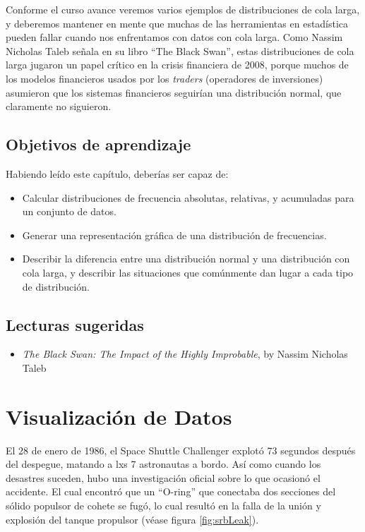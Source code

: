 \documentclass[
  12pt,
]{book}
\providecommand{\tightlist}{%
  \setlength{\itemsep}{0pt}\setlength{\parskip}{0pt}}
\begin{document}
Conforme el curso avance veremos varios ejemplos de distribuciones de cola larga, y deberemos mantener en mente que muchas de las herramientas en estadística pueden fallar cuando nos enfrentamos con datos con cola larga. Como Nassim Nicholas Taleb señala en su libro ``The Black Swan'', estas distribuciones de cola larga jugaron un papel crítico en la crisis financiera de 2008, porque muchos de los modelos financieros usados por los \emph{traders} (operadores de inversiones) asumieron que los sistemas financieros seguirían una distribución normal, que claramente no siguieron.

\hypertarget{objetivos-de-aprendizaje-2}{%
\section{Objetivos de aprendizaje}\label{objetivos-de-aprendizaje-2}}

Habiendo leído este capítulo, deberías ser capaz de:

\begin{itemize}
\tightlist
\item
  Calcular distribuciones de frecuencia absolutas, relativas, y acumuladas para un conjunto de datos.
\item
  Generar una representación gráfica de una distribución de frecuencias.
\item
  Describir la diferencia entre una distribución normal y una distribución con cola larga, y describir las situaciones que comúnmente dan lugar a cada tipo de distribución.
\end{itemize}

\hypertarget{lecturas-sugeridas-2}{%
\section{Lecturas sugeridas}\label{lecturas-sugeridas-2}}

\begin{itemize}
\tightlist
\item
  \emph{The Black Swan: The Impact of the Highly Improbable}, by Nassim Nicholas Taleb
\end{itemize}

\hypertarget{data-visualization}{%
\chapter{Visualización de Datos}\label{data-visualization}}

El 28 de enero de 1986, el Space Shuttle Challenger explotó 73 segundos después del despegue, matando a lxs 7 astronautas a bordo. Así como cuando los desastres suceden, hubo una investigación oficial sobre lo que ocasionó el accidente. El cual encontró que un ``O-ring'' que conectaba dos secciones del sólido populsor de cohete se fugó, lo cual resultó en la falla de la unión y explosión del tanque propulsor (véase figura \ref{fig:srbLeak}).
\end{document}
